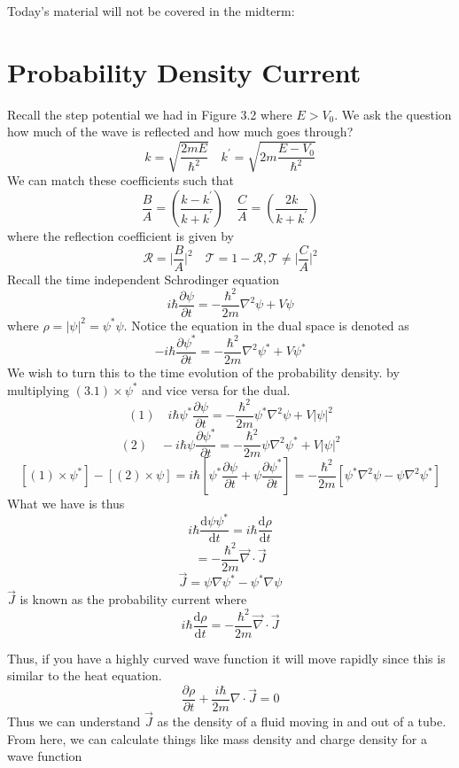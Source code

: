 Today's material will not be covered in the midterm:
\section{Probability Density Current}
Recall the step potential we had in Figure 3.2 where \(E > V_0\). We ask the question how much of the wave is reflected and how much goes 
through? 
\[
	k = \sqrt{\frac{2mE}{\hbar ^{2} }} \quad k^{\prime} = \sqrt{2m\frac{E-V_0}{\hbar ^{2} }} 
\] 
We can match these coefficients such that 
\[
	\frac{B}{A} = \left( \frac{k-k^{\prime} }{k+ k^{\prime} } \right) \quad \frac{C}{A} = \left( \frac{2k}{k + k^{\prime} } \right) 
\]
where the reflection coefficient is given by 
\[
	\mathcal{R}  = \vert \frac{B}{A} \vert ^{2} \quad \mathcal{T}  = 1 - \mathcal{R}, \mathcal{T}  \neq  \vert \frac{C}{A} \vert ^{2}  
\]
Recall the time independent Schrodinger equation
\begin{equation}
	i \hbar  \frac{\partial \psi }{\partial t} = - \frac{\hbar ^{2} }{2m} \nabla ^{2} \psi + V \psi  
\end{equation}
where \(\rho = \vert \psi  \vert ^{2}  = \psi^* \psi \). Notice the equation in the dual space is denoted as 
\[
	-i \hbar  \frac{\partial \psi ^*}{\partial t} = - \frac{\hbar ^{2} }{2m} \nabla ^{2}  \psi ^* + V \psi^* 
\]
We wish to turn this to the time evolution of the probability density. by multiplying \((3.1) \times  \psi^*\) and vice versa for the dual.  
\[
	(1) \quad  i\hbar \psi ^* \frac{\partial \psi }{\partial t} = - \frac{\hbar ^{2} }{2m} \psi ^* \nabla  ^{2}  \psi  + V \vert \psi  \vert  ^{2} 
\]
\[
	(2) \quad - i\hbar \psi  \frac{\partial \psi ^*}{\partial t} = - \frac{\hbar ^{2} }{2m} \psi \nabla ^{2} \psi ^* + V \vert \psi  \vert  ^{2} 
\]
\[
	\left[ (1) \times  \psi ^* \right] - \left[ (2) \times  \psi  \right] = 
	i\hbar  \left[ \psi ^* \frac{\partial \psi }{\partial t} + \psi  \frac{\partial \psi ^*}{\partial t}   \right]  = 
	- \frac{\hbar ^{2} }{2m} \left[  \psi ^* \nabla ^{2}  \psi - \psi  \nabla  ^{2}  \psi ^* \right] 
\]
What we have is thus 
\[
	i \hbar  \frac{\mathrm{d}\psi \psi ^*}{\mathrm{d}t} = i \hbar \frac{\mathrm{d}\rho}{\mathrm{d}t}  
\]
\[
	= - \frac{\hbar ^{2} }{2m }\vec{\nabla} \cdot \vec{J} 
\]
\[
	\vec{J}  = \psi \nabla \psi ^* - \psi ^* \nabla  \psi 
\]
\(\vec{J} \) is known as the probability current where 
\[
	i\hbar \frac{\mathrm{d}\rho}{\mathrm{d}t} = - \frac{\hbar ^{2} }{2m} \vec{\nabla} \cdot \vec{J}  
\] 

\begin{remark}
	Thus, if you have a highly curved wave function it will move rapidly since this is similar to the heat equation.
	\[
		\frac{\partial \rho}{\partial t} + \frac{i\hbar }{2m} \nabla \cdot \vec{J} = 0 
	\]
	Thus we can understand \(\vec{J} \) as the density of a fluid moving in and out of a tube. From here, we can calculate things like mass density and charge density for a wave function
\end{remark}

